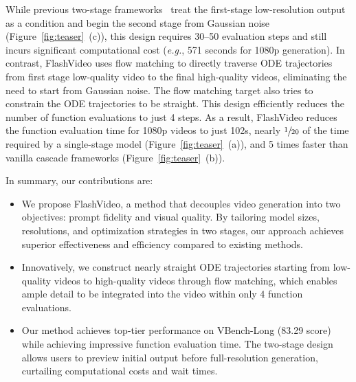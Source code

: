 While previous two-stage frameworks~\citep{upscaleavideo, lavie, venhancer} treat the first-stage low-resolution output as a condition and begin the second stage from Gaussian noise (Figure~\ref{fig:teaser}~(c)), this design requires 30–50 evaluation steps and still incurs significant computational cost (\textit{e.g.}, 571 seconds for 1080p generation). In contrast, FlashVideo uses flow matching to directly traverse ODE trajectories from first stage low-quality video to the final high-quality videos, eliminating the need to start from Gaussian noise. The flow matching target also tries to constrain the ODE trajectories to be straight. This design efficiently reduces the number of function evaluations to just 4 steps. As a result, FlashVideo reduces the function evaluation time for 1080p videos to just 102s, nearly $\sfrac{1}{20}$ of the time required by a single-stage model (Figure~\ref{fig:teaser}~(a)), and 5 times faster than vanilla cascade frameworks (Figure~\ref{fig:teaser}~(b)).

In summary, our contributions are: 

\begin{itemize}[leftmargin=*] 
\item We propose FlashVideo, a method that decouples video generation into two objectives: prompt fidelity and visual quality. By tailoring model sizes, resolutions, and optimization strategies in two stages, our approach achieves superior effectiveness and efficiency compared to existing methods.
\item  Innovatively, we construct nearly straight ODE trajectories starting from low-quality videos to high-quality videos through flow matching, which enables ample detail to be integrated into the video within only 4 function evaluations.
\item Our method achieves top-tier performance on VBench-Long (83.29 score) while achieving impressive function evaluation time. The two-stage design allows users to preview initial output before full-resolution generation, curtailing computational costs and wait times.
\end{itemize}

